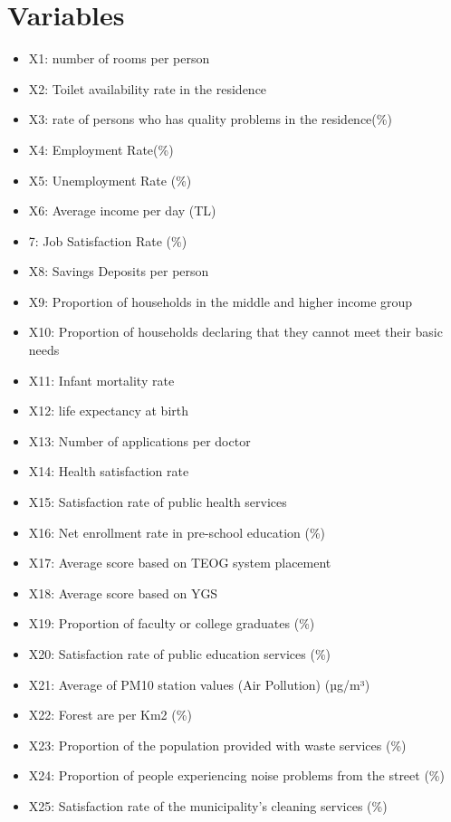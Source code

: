 \documentclass[12pt,twoside]{deuthesis}
\providecommand{\tightlist}{%
  \setlength{\itemsep}{0pt}\setlength{\parskip}{0pt}}
\begin{document}
\hypertarget{variables}{%
\section{Variables}\label{variables}}
\begin{itemize}
\tightlist
\item
  X1: number of rooms per person
\item
  X2: Toilet availability rate in the residence
\item
  X3: rate of persons who has quality problems in the residence(\%)
\item
  X4: Employment Rate(\%)
\item
  X5: Unemployment Rate (\%)
\item
  X6: Average income per day (TL)
\item
  7: Job Satisfaction Rate (\%)
\item
  X8: Savings Deposits per person
\item
  X9: Proportion of households in the middle and higher income group
\item
  X10: Proportion of households declaring that they cannot meet their basic needs
\item
  X11: Infant mortality rate
\item
  X12: life expectancy at birth
\item
  X13: Number of applications per doctor
\item
  X14: Health satisfaction rate
\item
  X15: Satisfaction rate of public health services
\item
  X16: Net enrollment rate in pre-school education (\%)
\item
  X17: Average score based on TEOG system placement
\item
  X18: Average score based on YGS
\item
  X19: Proportion of faculty or college graduates (\%)
\item
  X20: Satisfaction rate of public education services (\%)
\item
  X21: Average of PM10 station values (Air Pollution) (µg/m³)
\item
  X22: Forest are per Km2 (\%)
\item
  X23: Proportion of the population provided with waste services (\%)
\item
  X24: Proportion of people experiencing noise problems from the street (\%)
\item
  X25: Satisfaction rate of the municipality's cleaning services (\%)

\end{itemize}
\end{document}
